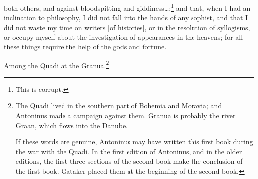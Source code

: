 \begin{enumerate}
both others, and against bloodspitting and giddiness\ldots;\footnote{This is corrupt.} and that, when I had an inclination to philosophy, I did not fall into the hands of any sophist, and that I did not waste my time on writers [{\clarify of histories}], or in the resolution of syllogisms, or occupy myself about the investigation of appearances in the heavens; for all these things require the help of the gods and fortune. 

Among the Quadi at the Granua.\footnote{The Quadi lived in the southern part of Bohemia and Moravia; and Antoninus made a campaign against them. Granua is probably the river Graan, which flows into the Danube.

If these words are genuine, Antoninus may have written this first book during the war with the Quadi. In the first edition of Antoninus, and in the older editions, the first three sections of the second book make the conclusion of the first book. Gataker placed them at the beginning of the second book.}
\end{enumerate}